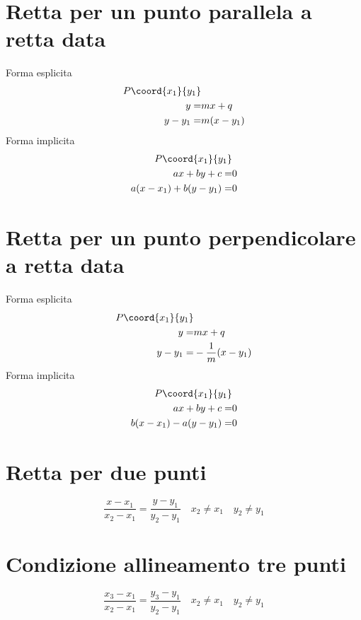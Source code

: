 \section{Retta per un punto parallela a retta data}
Forma esplicita
\begin{align*}
P\coord{x_1}{y_1}&\nonumber\\
y=&mx+q\nonumber\\
y-y_1=&m(x-y_1)
\end{align*}
Forma implicita
\begin{align*}
P\coord{x_1}{y_1}&\nonumber\\
ax+by+c=&0\nonumber\\
a(x-x_1)+b(y-y_1)=&0
\end{align*}
\section{Retta per un punto perpendicolare a retta data}
Forma esplicita
\begin{align*}
P\coord{x_1}{y_1}&\nonumber\\
y=&mx+q\nonumber\\
y-y_1=&-\dfrac{1}{m}(x-y_1)
\end{align*}
Forma implicita
\begin{align*}
P\coord{x_1}{y_1}&\nonumber\\
ax+by+c=&0\nonumber\\
b(x-x_1)-a(y-y_1)=&0
\end{align*}
\section{Retta per due punti}
\begin{equation*}
\dfrac{x-x_1}{x_2-x_1}=\dfrac{y-y_1}{y_2-y_1}\quad x_2\neq x_1\quad y_2\neq y_1
\end{equation*}
\section{Condizione allineamento tre  punti}
\begin{equation*}
\dfrac{x_3-x_1}{x_2-x_1}=\dfrac{y_3-y_1}{y_2-y_1}\quad x_2\neq x_1\quad y_2\neq y_1
\end{equation*}
